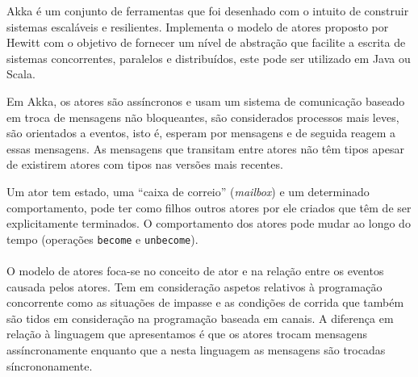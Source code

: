 Akka é um conjunto de ferramentas que foi desenhado com o intuito de construir sistemas escaláveis e resilientes.
Implementa o modelo de atores proposto por Hewitt  \cite{Hewitt:ActorFormalismForAI} com o objetivo de fornecer um nível de abstração que facilite a escrita de sistemas concorrentes, paralelos e distribuídos, este pode ser utilizado em Java ou Scala.

Em Akka, os atores são assíncronos e usam um sistema de comunicação baseado em troca de mensagens não bloqueantes, são considerados processos mais leves, são orientados a eventos, isto é, esperam por mensagens e de seguida reagem a essas mensagens. As mensagens que transitam entre atores não têm tipos apesar de existirem atores com tipos nas versões mais recentes.

Um ator tem estado, uma ``caixa de correio'' (\textit{mailbox}) e um determinado comportamento, pode ter como filhos outros atores por ele criados que têm de ser explicitamente terminados. O comportamento dos atores pode mudar ao longo do tempo (operações \lstinline"become" e \lstinline"unbecome").

\paragraph{}O modelo de atores foca-se no conceito de ator e na relação entre os eventos causada pelos atores. Tem em consideração aspetos relativos à programação concorrente como as situações de impasse e as condições de corrida que também são tidos em consideração na programação baseada em canais. A diferença em relação à linguagem que apresentamos é que os atores trocam mensagens assíncronamente enquanto que a nesta linguagem as mensagens são trocadas síncrononamente.


